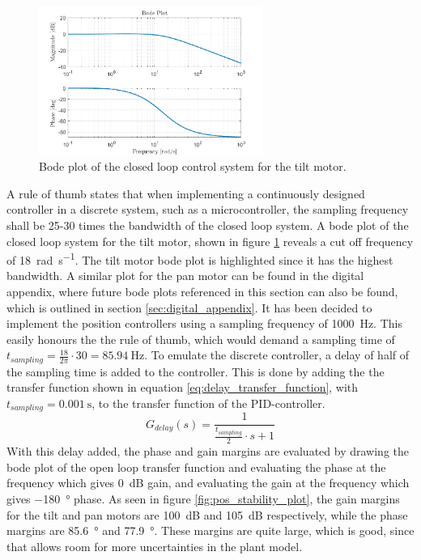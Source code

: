 \documentclass[../../main.tex]{subfiles}
\begin{document}
\begin{figure}[h]
    \centering
    \includegraphics[width=0.65\textwidth]{Sections/System_Design/Images/Bode_TiltMotorPos.png}
    \caption{Bode plot of the closed loop control system for the tilt motor.}
    \label{fig:pos_bode_plot}
\end{figure}

A rule of thumb states that when implementing a continuously designed controller in a discrete system, such as a microcontroller, the sampling frequency shall be 25-30 times the bandwidth of the closed loop system. A bode plot of the closed loop system for the tilt motor, shown in figure \ref{fig:pos_bode_plot} reveals a cut off frequency of \SI{18}{\radian \per \second}. The tilt motor bode plot is highlighted since it has the highest bandwidth. A similar plot for the pan motor can be found in the digital appendix, where future bode plots referenced in this section can also be found, which is outlined in section \ref{sec:digital_appendix}. It has been decided to implement the position controllers using a sampling frequency of \SI{1000}{\hertz}. This easily honours the the rule of thumb, which would demand a sampling time of $t_{sampling} = \frac{18}{2\pi}\cdot 30 = \SI{85.94}{\hertz}$.
To emulate the discrete controller, a delay of half of the sampling time is added to the controller. This is done by adding the the transfer function shown in equation \ref{eq:delay_transfer_function}, with $t_{sampling} = \SI{0.001}{\second}$, to the transfer function of the PID-controller. 
\begin{equation}\label{eq:delay_transfer_function}
    G_{delay}(s) = \frac{1}{\frac{t_{sampling}}{2}\cdot s+1}
\end{equation}
With this delay added, the phase and gain margins are evaluated by drawing the bode plot of the open loop transfer function and evaluating the phase at the frequency which gives  \SI{0}{\deci \bel} gain, and evaluating the gain at the frequency which gives \SI{-180}{\degree} phase. As seen in figure \ref{fig:pos_stability_plot}, the gain margins for the tilt and pan motors are \SI{100}{\deci \bel} and \SI{105}{\deci \bel} respectively, while the phase margins are \SI{85.6}{\degree} and \SI{77.9}{\degree}. These margins are quite large, which is good, since that allows room for more uncertainties in the plant model.
\end{document}
